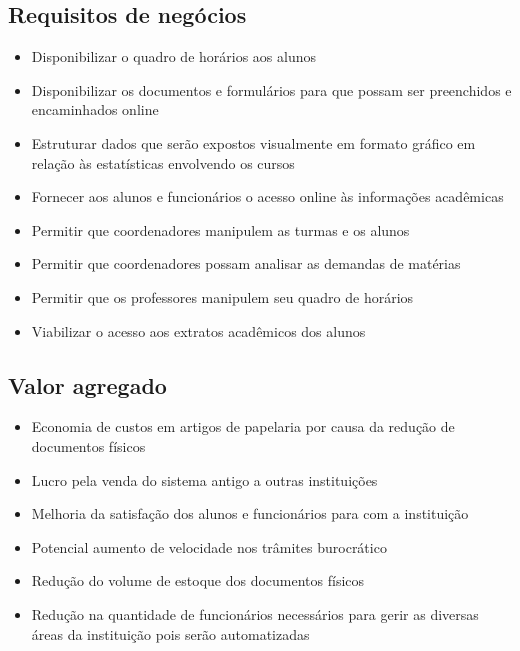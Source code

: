         \subsection{Requisitos de negócios}
            \begin{itemize}
                \item Disponibilizar o quadro de horários aos alunos
                \item Disponibilizar os documentos e formulários para que possam ser preenchidos e encaminhados online
                \item Estruturar dados que serão expostos visualmente em formato gráfico em relação às estatísticas envolvendo os cursos
                \item Fornecer aos alunos e funcionários o acesso online às informações acadêmicas
                \item Permitir que coordenadores manipulem as turmas e os alunos
                \item Permitir que coordenadores possam analisar as demandas de matérias
                \item Permitir que os professores manipulem seu quadro de horários
                \item Viabilizar o acesso aos extratos acadêmicos dos alunos
            \end{itemize}
            
        \subsection{Valor agregado}
            \begin{itemize}
                \item Economia de custos em artigos de papelaria por causa da redução de documentos físicos
                \item Lucro pela venda do sistema antigo a outras instituições
                \item Melhoria da satisfação dos alunos e funcionários para com a instituição
                \item Potencial aumento de velocidade nos trâmites burocrático
                \item Redução do volume de estoque dos documentos físicos
                \item Redução na quantidade de funcionários necessários para gerir as diversas áreas da instituição pois serão automatizadas
            \end{itemize}
            
